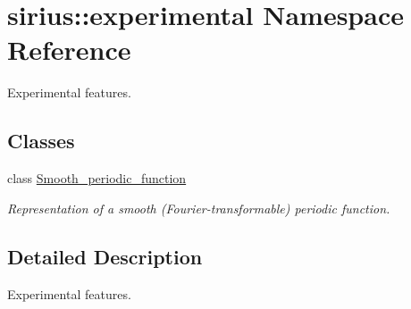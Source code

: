 \hypertarget{namespacesirius_1_1experimental}{}\section{sirius\+:\+:experimental Namespace Reference}
\label{namespacesirius_1_1experimental}


Experimental features.  


\subsection*{Classes}
\begin{DoxyCompactItemize}
\item 
class \hyperlink{classsirius_1_1experimental_1_1_smooth__periodic__function}{Smooth\+\_\+periodic\+\_\+function}
\begin{DoxyCompactList}\small\item\em Representation of a smooth (Fourier-\/transformable) periodic function. \end{DoxyCompactList}\end{DoxyCompactItemize}


\subsection{Detailed Description}
Experimental features. 